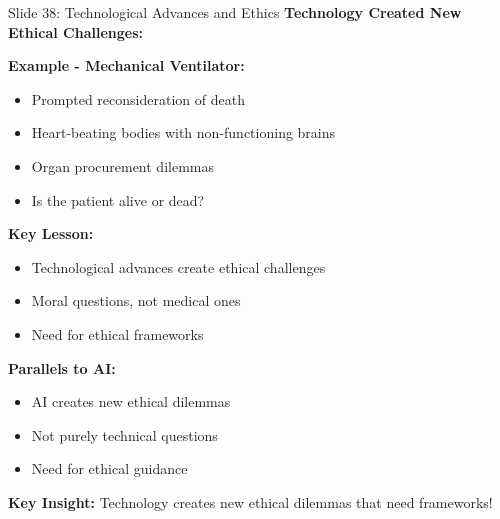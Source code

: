 \documentclass[8pt]{beamer}
\begin{document}
	\begin{frame}{Slide 38: Technological Advances and Ethics}
		\fontsize{6.5}{7.5}\selectfont
		\textbf{Technology Created New Ethical Challenges:}
		
		\vspace{0.1cm}
		\textbf{Example - Mechanical Ventilator:}
		\begin{itemize}
			\item Prompted reconsideration of death
			\item Heart-beating bodies with non-functioning brains
			\item Organ procurement dilemmas
			\item Is the patient alive or dead?
		\end{itemize}
		
		\vspace{0.1cm}
		\textbf{Key Lesson:}
		\begin{itemize}
			\item Technological advances create ethical challenges
			\item Moral questions, not medical ones
			\item Need for ethical frameworks
		\end{itemize}
		
		\vspace{0.1cm}
		\textbf{Parallels to AI:}
		\begin{itemize}
			\item AI creates new ethical dilemmas
			\item Not purely technical questions
			\item Need for ethical guidance
		\end{itemize}
		
		\textcolor{myblue}{\textbf{Key Insight:}} Technology creates \textcolor{myblue}{new ethical dilemmas} that need frameworks!
	\end{frame}
	
\end{document}
